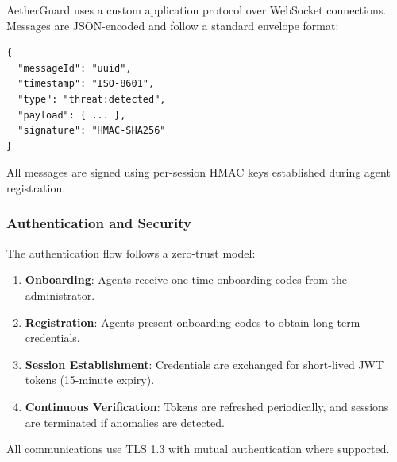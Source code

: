 AetherGuard uses a custom application protocol over WebSocket connections. Messages are JSON-encoded and follow a standard envelope format:

\begin{verbatim}
{
  "messageId": "uuid",
  "timestamp": "ISO-8601",
  "type": "threat:detected",
  "payload": { ... },
  "signature": "HMAC-SHA256"
}
\end{verbatim}

All messages are signed using per-session HMAC keys established during agent registration.

\subsubsection{Authentication and Security}

The authentication flow follows a zero-trust model:

\begin{enumerate}
    \item \textbf{Onboarding}: Agents receive one-time onboarding codes from the administrator.
    \item \textbf{Registration}: Agents present onboarding codes to obtain long-term credentials.
    \item \textbf{Session Establishment}: Credentials are exchanged for short-lived JWT tokens (15-minute expiry).
    \item \textbf{Continuous Verification}: Tokens are refreshed periodically, and sessions are terminated if anomalies are detected.
\end{enumerate}

All communications use TLS 1.3 with mutual authentication where supported.

